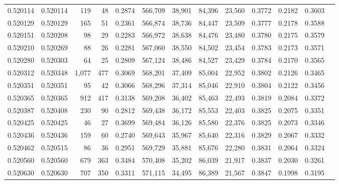 \begin{tabular}{rrrrrrrrrrrrr}
0.520114 & 0.520114 &   119 &    48 &                                     0.2874 & 566,709 &  38,901 &  84,396 &  23,560 & 0.3772 & 0.2182 & 0.3603 \\
0.520129 & 0.520129 &   165 &    51 &                                     0.2361 & 566,874 &  38,736 &  84,447 &  23,509 & 0.3777 & 0.2178 & 0.3588 \\
0.520151 & 0.520208 &    98 &    29 &                                     0.2283 & 566,972 &  38,638 &  84,476 &  23,480 & 0.3780 & 0.2175 & 0.3579 \\
0.520210 & 0.520269 &    88 &    26 &                                     0.2281 & 567,060 &  38,550 &  84,502 &  23,454 & 0.3783 & 0.2173 & 0.3571 \\
0.520280 & 0.520303 &    64 &    25 &                                     0.2809 & 567,124 &  38,486 &  84,527 &  23,429 & 0.3784 & 0.2170 & 0.3565 \\
0.520312 & 0.520348 & 1,077 &   477 &                                     0.3069 & 568,201 &  37,409 &  85,004 &  22,952 & 0.3802 & 0.2126 & 0.3465 \\
0.520351 & 0.520351 &    95 &    42 &                                     0.3066 & 568,296 &  37,314 &  85,046 &  22,910 & 0.3804 & 0.2122 & 0.3456 \\
0.520365 & 0.520365 &   912 &   417 &                                     0.3138 & 569,208 &  36,402 &  85,463 &  22,493 & 0.3819 & 0.2084 & 0.3372 \\
0.520387 & 0.520408 &   230 &    90 &                                     0.2812 & 569,438 &  36,172 &  85,553 &  22,403 & 0.3825 & 0.2075 & 0.3351 \\
0.520425 & 0.520425 &    46 &    27 &                                     0.3699 & 569,484 &  36,126 &  85,580 &  22,376 & 0.3825 & 0.2073 & 0.3346 \\
0.520436 & 0.520436 &   159 &    60 &                                     0.2740 & 569,643 &  35,967 &  85,640 &  22,316 & 0.3829 & 0.2067 & 0.3332 \\
0.520462 & 0.520515 &    86 &    36 &                                     0.2951 & 569,729 &  35,881 &  85,676 &  22,280 & 0.3831 & 0.2064 & 0.3324 \\
0.520560 & 0.520560 &   679 &   363 &                                     0.3484 & 570,408 &  35,202 &  86,039 &  21,917 & 0.3837 & 0.2030 & 0.3261 \\
0.520630 & 0.520630 &   707 &   350 &                                     0.3311 & 571,115 &  34,495 &  86,389 &  21,567 & 0.3847 & 0.1998 & 0.3195 \\

\end{tabular}
